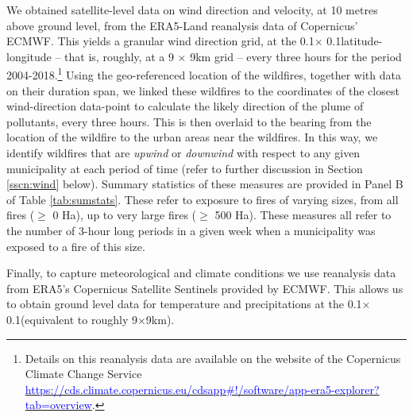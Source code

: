 \documentclass[11pt]{article}
\begin{document}
\begin{spacing}{1.5}
We obtained satellite-level data on wind direction and velocity, at 10 metres above ground level, from the ERA5-Land reanalysis data of Copernicus' ECMWF. This yields a granular wind direction grid, at the 0.1\textdegree $\times$ 0.1\textdegree latitude-longitude -- that is, roughly, at a 9 $\times$ 9km grid -- every three hours for the period 2004-2018.\footnote{Details on this reanalysis data are available on the website of the Copernicus Climate Change Service \hyperlink{https://cds.climate.copernicus.eu/cdsapp\#!/software/app-era5-explorer?tab=overview}{\textcolor{blue}{https://cds.climate.copernicus.eu/cdsapp\#!/software/app-era5-explorer?tab=overview}}.} Using the geo-referenced location of the wildfires, together with data on their duration span, we linked these wildfires to the coordinates of the closest wind-direction data-point to calculate the likely direction of the plume of pollutants, every three hours. This is then overlaid to the bearing from the location of the wildfire to the urban areas near the wildfires. In this way, we identify wildfires that are \textit{upwind} or \textit{downwind} with respect to any given municipality at each period of time (refer to further discussion in Section \ref{sscn:wind} below). Summary statistics of these measures are provided in Panel B of Table \ref{tab:sumstats}.  These refer to exposure to fires of varying sizes, from all fires ($\geq$ 0 Ha), up to very large fires ($\geq$ 500 Ha).  These measures all refer to the number of 3-hour long periods in a given week when a municipality was exposed to a fire of this size.  

Finally, to capture meteorological and climate conditions we use reanalysis data from ERA5's Copernicus Satellite Sentinels provided by ECMWF. This allows us to obtain ground level data for temperature and precipitations at the 0.1\textdegree $\times$ 0.1\textdegree (equivalent to roughly 9$\times$9km). %





\end{spacing}
\end{document}
